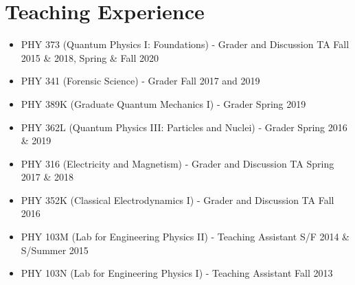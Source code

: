 \section*{Teaching Experience}
\begin{itemize}

\item PHY 373 (Quantum Physics I: Foundations) - Grader and Discussion TA \hfill{Fall 2015 \& 2018, Spring \& Fall 2020}

\item PHY 341 (Forensic Science) - Grader \hfill Fall 2017 and 2019

\item PHY 389K (Graduate Quantum Mechanics I) - Grader \hfill{Spring 2019}

\item PHY 362L (Quantum Physics III: Particles and Nuclei) - Grader \hfill{Spring 2016 \& 2019}

\item PHY 316 (Electricity and Magnetism) - Grader and Discussion TA \hfill Spring 2017 \& 2018

\item PHY 352K (Classical Electrodynamics I) - Grader and Discussion TA \hfill Fall 2016

\item PHY 103M (Lab for Engineering Physics II) - Teaching Assistant \hfill {S/F 2014 \& S/Summer 2015}

\item PHY 103N (Lab for Engineering Physics I) - Teaching Assistant \hfill {Fall 2013}

\end{itemize}
